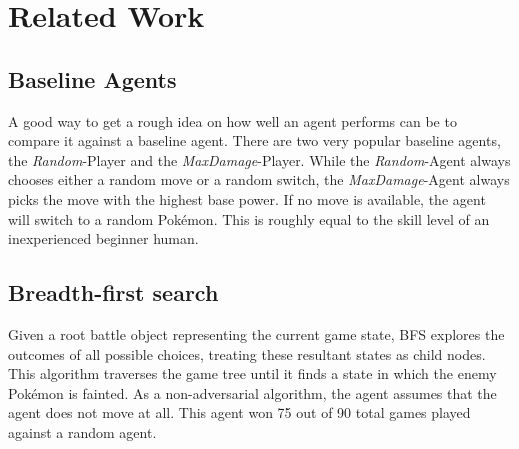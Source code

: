 
\chapter{Related Work}
\label{ch:relatedwork}

\section{Baseline Agents}
\label{sec:eval-challenges-baseline}
A good way to get a rough idea on how well an agent performs can be to compare it against a baseline agent.
There are two very popular baseline agents, the \textit{Random}-Player and the \textit{MaxDamage}-Player.
While the \textit{Random}-Agent always chooses either a random move or a random switch, the \textit{MaxDamage}-Agent
always picks the move with the highest base power. If no move is available, the agent will switch to a random 
Pokémon. This is roughly equal to the skill level of an inexperienced beginner human. 

\section{Breadth-first search}
\label{sec:related-bfs}
Given a root battle object representing the current game state, \ac{BFS} explores the outcomes of all possible choices,
treating these resultant states as child nodes. This algorithm traverses the game tree until it finds a state in which
the enemy Pokémon is fainted. As a non-adversarial algorithm, the agent assumes that the agent does not move at all.
This agent won 75 out of 90 total games played against a random agent\cite{Lee_Togelius_2017}.

